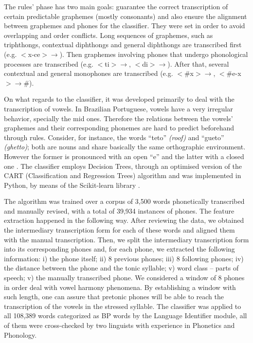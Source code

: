 The rules' phase has two main goals: guarantee the correct transcription of certain predictable graphemes (mostly consonants)
and also ensure the alignment between graphemes and phones for the classifier. They were set in order to avoid
overlapping and order conflicts. Long sequences of graphemes, such as triphthongs, contextual diphthongs and general 
diphthongs are transcribed first (e.g.  $<$x-ce$> \rightarrow $\textipa{[-se]}). 
Then graphemes involving phones that undergo phonological processes are transcribed (e.g. $<$ti$> \rightarrow $\textipa{[tSi]},
$<$di$> \rightarrow $\textipa{[dZi]}). After that, several contextual and general monophones are transcribed 
(e.g. $<$\#x$> \rightarrow $\textipa{[S]}, $<$\#e-x$> \rightarrow $\textipa{[}\#\textipa{e-z]}). 

On what regards to the classifier, it was developed primarily to deal with the transcription of vowels. In Brazilian
Portuguese, vowels have a very irregular behavior, specially the mid ones. Therefore the relations between the vowels' 
graphemes and their corresponding phonemes are hard to predict beforehand through rules. Consider, for instance, the words 
``teto'' \emph{(roof)} and ``gueto'' \emph{(ghetto)}; both are nouns and share basically the same orthographic environment.
However the former is pronounced with an open ``e'' \textipa{["tE.tU]} and the latter with a closed one \textipa{["ge.tU]}.
The classifier employs Decision Trees, through an optimised version of the CART (Classification and Regression Trees)
algorithm and was implemented in Python, by means of the Scikit-learn library \cite{Scikit2011}. 

The algorithm was trained over a corpus of 3,500 words phonetically transcribed and manually revised, with a total
of 39,934 instances of phones. The feature extraction happened in the following way. After reviewing the data, we obtained the intermediary 
transcription form for each of these words and aligned them with the manual transcription. Then, we split
the intermediary transcription form into its corresponding phones and, for each phone, we extracted the following 
information: i) the phone itself; ii) 8 previous phones; iii) 8 following phones; iv) the distance between 
the phone and the tonic syllable; v) word class -- parts of speech; v) the manually transcribed phone. We considered
a window of 8 phones in order deal with vowel harmony phenomena. By establishing a window with such length, one 
can assure that pretonic phones will be able to reach the transcription of the vowels in the stressed syllable.
The classifier was applied to all 108,389 words categorized as BP words by the Language Identifier module,
all of them were cross-checked by two linguists with experience in Phonetics and Phonology.

